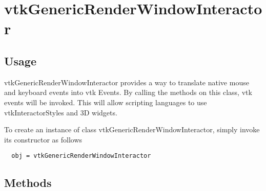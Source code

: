 \section{vtkGenericRenderWindowInteractor}

\subsection{Usage}

 vtkGenericRenderWindowInteractor provides a way to translate native
 mouse and keyboard events into vtk Events.   By calling the methods on
 this class, vtk events will be invoked.   This will allow scripting
 languages to use vtkInteractorStyles and 3D widgets.

To create an instance of class vtkGenericRenderWindowInteractor, simply
invoke its constructor as follows
\begin{verbatim}
  obj = vtkGenericRenderWindowInteractor
\end{verbatim}
\subsection{Methods}

